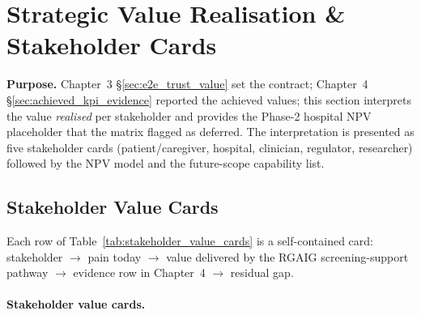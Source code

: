 \section{Strategic Value Realisation \& Stakeholder Cards}
\label{sec:strategic_value_realisation}

\noindent\textbf{Purpose.} Chapter~3 \S\ref{sec:e2e_trust_value} set the
contract; Chapter~4 \S\ref{sec:achieved_kpi_evidence} reported the
achieved values; this section interprets the value \emph{realised} per
stakeholder and provides the Phase-2 hospital NPV placeholder that the
matrix flagged as deferred. The interpretation is presented as five
stakeholder cards (patient/caregiver, hospital, clinician, regulator,
researcher) followed by the NPV model and the future-scope capability
list.

\subsection{Stakeholder Value Cards}
\label{subsec:stakeholder_value_cards}

\noindent Each row of Table~\ref{tab:stakeholder_value_cards} is a
self-contained card: stakeholder $\to$ pain today $\to$ value delivered
by the RGAIG screening-support pathway $\to$ evidence row in Chapter~4
$\to$ residual gap.

\paragraph{Stakeholder value cards.}

